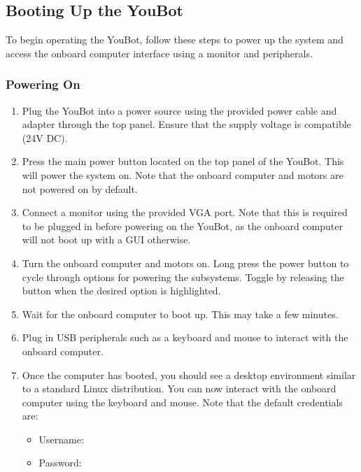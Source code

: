 \documentclass[a4paper, 12pt]{article}
\newif\ifshownotes
\newcommand{\notes}[1]{\ifshownotes\textcolor{blue}{#1}\fi}
\newcommand{\code}[1]{\texttt{\detokenize{#1}}}
\begin{document}
    \subsection{Booting Up the YouBot}
    To begin operating the YouBot, follow these steps to power up the system and access the onboard computer interface using a monitor and peripherals. 

    \subsubsection{Powering On}
    \begin{enumerate}[topsep=0pt, noitemsep]
        \item Plug the YouBot into a power source using the provided power cable and adapter through the top panel. Ensure that the supply voltage is compatible (24V DC).
        \item Press the main power button located on the top panel of the YouBot. This will power the system on. Note that the onboard computer and motors are not powered on by default. 
        \item Connect a monitor using the provided VGA port. Note that this is required to be plugged in before powering on the YouBot, as the onboard computer will not boot up with a GUI otherwise. 
        \item Turn the onboard computer and motors on. Long press the power button to cycle through options for powering the subsystems. Toggle by releasing the button when the desired option is highlighted. 
        \item Wait for the onboard computer to boot up. This may take a few minutes. 
        \item Plug in USB peripherals such as a keyboard and mouse to interact with the onboard computer.
        \item Once the computer has booted, you should see a desktop environment similar to a standard Linux distribution. You can now interact with the onboard computer using the keyboard and mouse. Note that the default credentials are: 
        \begin{itemize}[topsep=0pt, noitemsep]
            \item Username: \code{youbot}
            \item Password: \code{youbot}
        \end{itemize}
    \end{enumerate}

    \notes{add image of the booting up process.}
\end{document}

